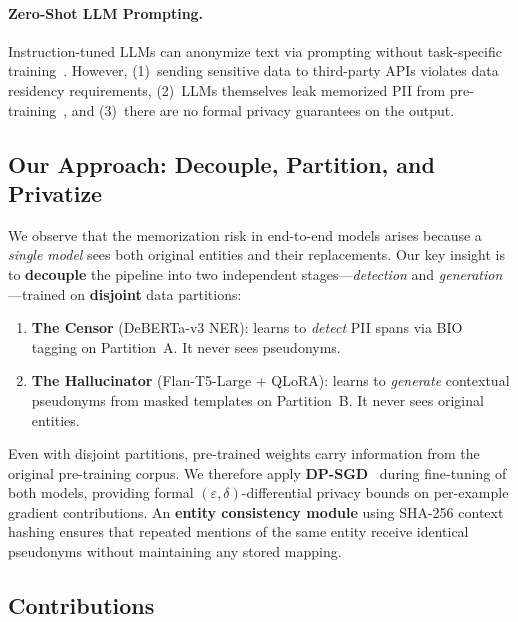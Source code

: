 \documentclass[11pt, a4paper]{article}
\begin{document}
\paragraph{Zero-Shot LLM Prompting.}
Instruction-tuned LLMs can anonymize text via prompting without
task-specific training~\cite{staab2024llm_privacy}.  However, (1)~sending sensitive data to
third-party APIs violates data residency requirements, (2)~LLMs
themselves leak memorized PII from pre-training~\cite{lukas2023analyzing},
and (3)~there are no formal privacy guarantees on the output.

\subsection{Our Approach: Decouple, Partition, and Privatize}

We observe that the memorization risk in end-to-end models arises because
a \emph{single model} sees both original entities and their replacements.
Our key insight is to \textbf{decouple} the pipeline into two independent
stages---\emph{detection} and \emph{generation}---trained on
\textbf{disjoint} data partitions:

\begin{enumerate}[leftmargin=*]
  \item \textbf{The Censor} (DeBERTa-v3 NER): learns to \emph{detect}
        PII spans via BIO tagging on Partition~A.  It never sees
        pseudonyms.
  \item \textbf{The Hallucinator} (Flan-T5-Large + QLoRA): learns to
        \emph{generate} contextual pseudonyms from masked templates on
        Partition~B.  It never sees original entities.
\end{enumerate}

Even with disjoint partitions, pre-trained weights carry information from
the original pre-training corpus.  We therefore apply
\textbf{DP-SGD}~\cite{abadi2016deep} during fine-tuning of both
models, providing formal $(\varepsilon, \delta)$-differential privacy
bounds on per-example gradient contributions.  An \textbf{entity
consistency module} using SHA-256 context hashing ensures that repeated
mentions of the same entity receive identical pseudonyms without
maintaining any stored mapping.

\subsection{Contributions}
\end{document}
